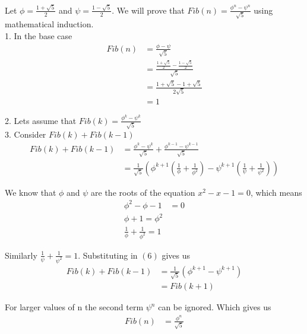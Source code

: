 \documentclass[a4paper,12pt]{article}
\begin{document}
Let $\phi=\frac{1+\sqrt{5}}{2}$ and $\psi=\frac{1-\sqrt{5}}{2}$. We will prove that \( Fib(n) = \frac{\phi^n - \psi^n}{\sqrt{5}} \) using mathematical induction. \\

1. In the base case
\begin{align}
Fib (n) &= \frac{\phi - \psi}{\sqrt{5}} \\ 
& = \frac{\frac{1+\sqrt{5}}{2} - \frac{1-\sqrt{5}}{2}}{\sqrt{5}} \\
& = \frac{1+\sqrt{5}-1+\sqrt{5}}{2\sqrt{5}} \\
& = 1
\end{align}

2. Lets assume that \(Fib(k) = \frac{\phi^k - \psi^k}{\sqrt{5}} \) \\

3. Consider \(Fib(k) + Fib(k-1) \)
\begin{align}
Fib(k) + Fib(k-1) &=  \frac{\phi^k - \psi^k}{\sqrt{5}} + \frac{\phi^{k-1} - \psi^{k-1}}{\sqrt{5}} \\
& = \frac{1}{\sqrt{5}} (\phi^{k+1}(\frac{1}{\phi} + \frac{1}{\phi^2}) - \psi^{k+1}(\frac{1}{\psi} + \frac{1}{\psi^2}))
\end{align}

We know that $\phi$ and $\psi$ are the roots of the equation \(x^2 - x - 1 = 0 \), which means
\begin{align}
\phi^2 - \phi - 1 &= 0 \\
\phi + 1 = \phi^2 \\
\frac{1}{\phi} + \frac{1}{\phi^2} = 1 
\end{align}

Similarly \( \frac{1}{\psi} + \frac{1}{\psi^2} = 1 \). Substituting in $(6)$ gives us
\begin{align}
Fib(k) + Fib(k-1) &= \frac{1}{\sqrt{5}} (\phi^{k+1} - \psi^{k+1}) \\
& = Fib(k+1)
\end{align}

For larger values of n the second term \( \psi^n \) can be ignored. Which gives us 
\begin{align}
Fib(n) &= \frac{\phi^n}{\sqrt{5}}
\end{align}
\end{document}
